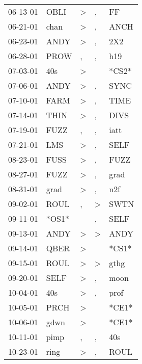 \begin{supertabular}{lllll}
 06-13-01 &   OBLI &     \textgreater &                , &     FF \\
 06-21-01 &   chan &     \textgreater &                , &   ANCH \\
 06-23-01 &   ANDY &     \textgreater &                , &    2X2 \\
 06-28-01 &   PROW &                , &                , &    h19 \\
 07-03-01 &    40s &     \textgreater &                  &  *CS2* \\
 07-06-01 &   ANDY &     \textgreater &                , &   SYNC \\
 07-10-01 &   FARM &     \textgreater &                , &   TIME \\
 07-14-01 &   THIN &     \textgreater &                , &   DIVS \\
 07-19-01 &   FUZZ &                , &                , &   iatt \\
 07-21-01 &    LMS &     \textgreater &                , &   SELF \\
 08-23-01 &   FUSS &     \textgreater &                , &   FUZZ \\
 08-27-01 &   FUZZ &     \textgreater &                , &   grad \\
 08-31-01 &   grad &     \textgreater &                , &    n2f \\
 09-02-01 &   ROUL &                , &     \textgreater &   SWTN \\
 09-11-01 &  *OS1* &                  &                , &   SELF \\
 09-13-01 &   ANDY &     \textgreater &     \textgreater &   ANDY \\
 09-14-01 &   QBER &     \textgreater &                  &  *CS1* \\
 09-15-01 &   ROUL &     \textgreater &     \textgreater &   gthg \\
 09-20-01 &   SELF &     \textgreater &                , &   moon \\
 10-04-01 &    40s &     \textgreater &                , &   prof \\
 10-05-01 &   PRCH &     \textgreater &                  &  *CE1* \\
 10-06-01 &   gdwn &     \textgreater &                  &  *CE1* \\
 10-11-01 &   pimp &                , &                , &    40s \\
 10-23-01 &   ring &     \textgreater &                , &   ROUL \\

\end{supertabular}
